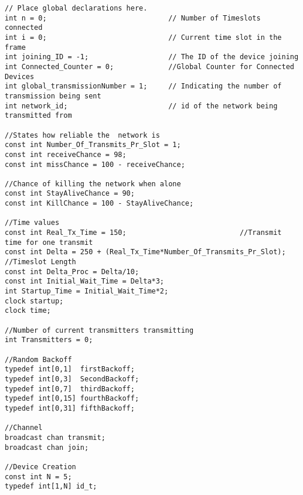 \begin{lstlisting}[style=UPPAAL,
caption={Code for the global declarations in CCUC}]
// Place global declarations here.
int n = 0;                             // Number of Timeslots connected
int i = 0;                             // Current time slot in the frame
int joining_ID = -1;                   // The ID of the device joining       
int Connected_Counter = 0;             //Global Counter for Connected Devices
int global_transmissionNumber = 1;     // Indicating the number of transmission being sent
int network_id;                        // id of the network being transmitted from

//States how reliable the  network is
const int Number_Of_Transmits_Pr_Slot = 1;
const int receiveChance = 98;
const int missChance = 100 - receiveChance;

//Chance of killing the network when alone
const int StayAliveChance = 90;
const int KillChance = 100 - StayAliveChance;

//Time values
const int Real_Tx_Time = 150;                           //Transmit time for one transmit
const int Delta = 250 + (Real_Tx_Time*Number_Of_Transmits_Pr_Slot);    //Timeslot Length
const int Delta_Proc = Delta/10;
const int Initial_Wait_Time = Delta*3;
int Startup_Time = Initial_Wait_Time*2;
clock startup;
clock time;

//Number of current transmitters transmitting
int Transmitters = 0;

//Random Backoff
typedef int[0,1]  firstBackoff;
typedef int[0,3]  SecondBackoff;
typedef int[0,7]  thirdBackoff;
typedef int[0,15] fourthBackoff;
typedef int[0,31] fifthBackoff;

//Channel
broadcast chan transmit;
broadcast chan join;

//Device Creation
const int N = 5;
typedef int[1,N] id_t;
\end{lstlisting}
